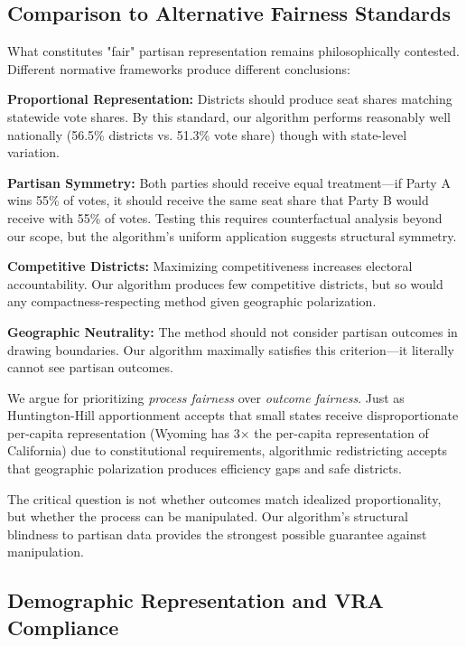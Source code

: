\subsection{Comparison to Alternative Fairness Standards}

What constitutes "fair" partisan representation remains philosophically contested. Different normative frameworks produce different conclusions:

\textbf{Proportional Representation:} Districts should produce seat shares matching statewide vote shares. By this standard, our algorithm performs reasonably well nationally (56.5\% districts vs. 51.3\% vote share) though with state-level variation.

\textbf{Partisan Symmetry:} Both parties should receive equal treatment—if Party A wins 55\% of votes, it should receive the same seat share that Party B would receive with 55\% of votes. Testing this requires counterfactual analysis beyond our scope, but the algorithm's uniform application suggests structural symmetry.

\textbf{Competitive Districts:} Maximizing competitiveness increases electoral accountability. Our algorithm produces few competitive districts, but so would any compactness-respecting method given geographic polarization.

\textbf{Geographic Neutrality:} The method should not consider partisan outcomes in drawing boundaries. Our algorithm maximally satisfies this criterion—it literally cannot see partisan outcomes.

We argue for prioritizing \textit{process fairness} over \textit{outcome fairness}. Just as Huntington-Hill apportionment accepts that small states receive disproportionate per-capita representation (Wyoming has 3× the per-capita representation of California) due to constitutional requirements, algorithmic redistricting accepts that geographic polarization produces efficiency gaps and safe districts.

The critical question is not whether outcomes match idealized proportionality, but whether the process can be manipulated. Our algorithm's structural blindness to partisan data provides the strongest possible guarantee against manipulation.

\subsection{Demographic Representation and VRA Compliance}
\label{sec:vra-compliance}

